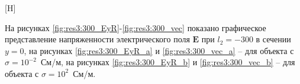 \documentclass[a4paper,14pt]{article}
\makeatletter
\renewenvironment{figure}[1][\fps@figure]{
  \edef\@tempa{\noexpand\@float{figure}[#1]}
  \@tempa
  \addtocounter{foofigure}{1}
}{
  \end@float
}
\renewcommand{\Re}{\mathop{\mathrm{Re}}\nolimits}
\makeatother
\begin{document}
\begin{figure}[H]
	\centering
	\text{~~}
	\caption{$\Re(\mathbf{E}_z)$ при $l_2=-200$}
	\label{fig:res3:200_EzR}
\end{figure}

На рисунках \ref{fig:res3:300_EyR}-\ref{fig:res3:300_vec} показано графическое представление напряженности электрического поля $\mathbf{E}$ при $l_2=-300$ в сечении $y=0$, на рисунках \ref{fig:res3:300_EyR_a} и \ref{fig:res3:300_vec_a} -- для объекта с $\sigma=10^{-2}$~См/м, на рисунках \ref{fig:res3:300_EyR_b} и \ref{fig:res3:300_vec_b} -- для объекта с $\sigma=10^{2}$~См/м.
\end{document}
